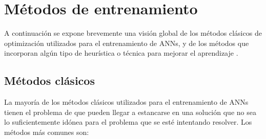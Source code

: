 \newpage
\section{Métodos de entrenamiento}\label{metodosEntrena}
A continuación se expone brevemente una visión global de los
métodos clásicos de optimización utilizados para el entrenamiento de ANNs, y de los
métodos que incorporan algún tipo de heurística o técnica para mejorar el aprendizaje
\cite{Kordik2010}.

\subsection{Métodos clásicos}\label{mClasicos}
\noindent La mayoría de los métodos clásicos utilizados para el entrenamiento de
ANNs tienen el problema de que pueden llegar a estancarse en una
solución que no sea lo suficientemente idónea para el problema que se
esté intentando resolver. Los métodos más comunes son:
